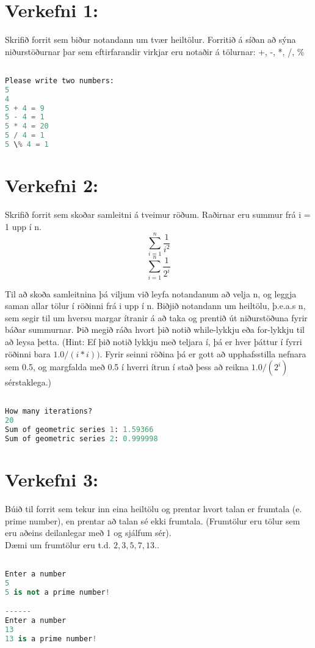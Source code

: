 \documentclass[11pt,a4paper]{article}
\begin{document}
\section*{Verkefni 1:}

Skrifið forrit sem biður notandann um tvær heiltölur. Forritið á síðan að sýna niðurstöðurnar þar sem eftirfarandir virkjar eru notaðir á tölurnar: +, -, *, /, \%



\begin{lstlisting}[language=Python, caption = Example]

Please write two numbers: 
5 
4 
5 + 4 = 9 
5 - 4 = 1 
5 * 4 = 20 
5 / 4 = 1  
5 \% 4 = 1
\end{lstlisting}

\section*{Verkefni 2:}

Skrifið forrit sem skoðar samleitni á tveimur röðum. 
Raðirnar eru summur frá i = 1 upp í n.
$$ \sum_{i = 1}^{n} \frac{1}{i^2}  $$
$$ \sum_{i = 1}^{n} \frac{1}{2^i} $$

Til að skoða samleitnina þá viljum við leyfa notandanum að velja n, og leggja saman allar tölur í röðinni frá i upp í n.
Biðjið notandann um heiltölu, þ.e.a.s n, sem segir til um hversu margar ítranir á að taka og prentið út niðurstöðuna fyrir báðar summurnar. Þið megið ráða hvort þið notið while-lykkju eða for-lykkju til að leysa þetta.
(Hint: Ef þið notið lykkju með teljara í, þá er hver þáttur í fyrri röðinni bara $1.0/(i*i))$.
Fyrir seinni röðina þá er gott að upphafsstilla nefnara sem 0.5, og margfalda með 0.5 í hverri ítrun í stað þess að reikna $1.0/(2^i)$ sérstaklega.)

\begin{lstlisting}[language=Python, caption = Example]

How many iterations?
20
Sum of geometric series 1: 1.59366
Sum of geometric series 2: 0.999998
\end{lstlisting}


\section*{Verkefni 3:}
Búið til forrit sem tekur inn eina heiltölu og prentar hvort talan er frumtala (e. prime number), en prentar að talan sé ekki frumtala. (Frumtölur eru tölur sem eru aðeins deilanlegar með 1 og sjálfum sér).\\
Dæmi um frumtölur eru t.d. $2,3,5,7,13 ..$

\begin{lstlisting}[language=Python, caption = Example]

Enter a number
5
5 is not a prime number!

------
Enter a number
13
13 is a prime number!

\end{lstlisting}
\end{document}
